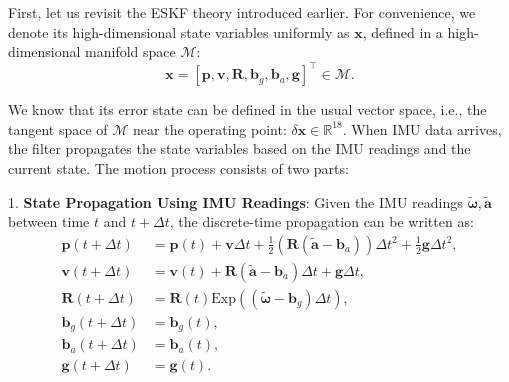 First, let us revisit the ESKF theory introduced earlier. For convenience, we denote its high-dimensional state variables uniformly as $\mathbf{x}$, defined in a high-dimensional manifold space $\mathcal{M}$:  
\begin{equation}\label{eq:def-of-state-variable}  
	\mathbf{x} = [\mathbf{p}, \mathbf{v}, \mathbf{R}, \mathbf{b}_g, \mathbf{b}_a, \mathbf{g}]^\top \in \mathcal{M}.  
\end{equation}  

We know that its error state can be defined in the usual vector space, i.e., the tangent space of $\mathcal{M}$ near the operating point: $\delta \mathbf{x} \in \mathbb{R}^{18}$. When IMU data arrives, the filter propagates the state variables based on the IMU readings and the current state. The motion process consists of two parts:  

1. \textbf{State Propagation Using IMU Readings}: Given the IMU readings $\tilde{\boldsymbol{\omega}}, \tilde{\mathbf{a}}$ between time $t$ and $t+\Delta t$, the discrete-time propagation can be written as:  
\begin{subequations}\label{key}  
	\begin{align}  
		\mathbf{p}(t+\Delta t) &= \mathbf{p}(t) + \mathbf{v} \Delta t + \frac{1}{2}   
		\left(\mathbf{R}(\tilde{\mathbf{a}}-\mathbf{b}_a) \right) \Delta t^2 + \frac{1}{2} \mathbf{g} \Delta t^2, \\  
		\mathbf{v}(t+\Delta t) &= \mathbf{v}(t) + \mathbf{R} (\tilde{\mathbf{a}} - \mathbf{b}_a) \Delta t + \mathbf{g} \Delta t, \\  
		\mathbf{R}(t+\Delta t) &= \mathbf{R}(t) \mathrm{Exp} \left( (\tilde{\boldsymbol{\omega}}-\mathbf{b}_g)   
		\Delta t \right), \\  
		\mathbf{b}_g(t+\Delta t) &= \mathbf{b}_g(t), \\  
		\mathbf{b}_a(t+\Delta t) &= \mathbf{b}_a(t), \\  
		\mathbf{g}(t+\Delta t) &= \mathbf{g}(t) .  
	\end{align}  
\end{subequations}  

